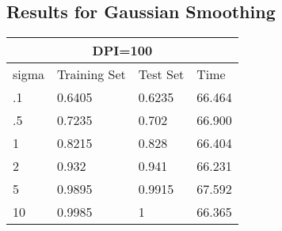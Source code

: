 \documentclass[paper=a4, fontsize=11pt]{scrartcl} %
\numberwithin{equation}{section} %
\numberwithin{figure}{section} %
\numberwithin{table}{section} %
\begin{document}
\subsection*{Results for Gaussian Smoothing}
\begin{tabular}{ |p{3cm}|p{3cm}|p{3cm}|p{3cm}|  }
 \hline
 \multicolumn{4}{|c|}{DPI=100} \\
 \hline
 sigma & Training Set & Test Set & Time\\
 \hline
 .1 & 0.6405 & 0.6235 & 66.464\\
 .5 & 0.7235 & 0.702 & 66.900\\
 1 & 0.8215 & 0.828 & 66.404\\
 2 & 0.932 & 0.941 & 66.231\\
 5 & 0.9895 & 0.9915 & 67.592\\
 10 & 0.9985 & 1 & 66.365\\
 \hline
\end{tabular}



\end{document}
